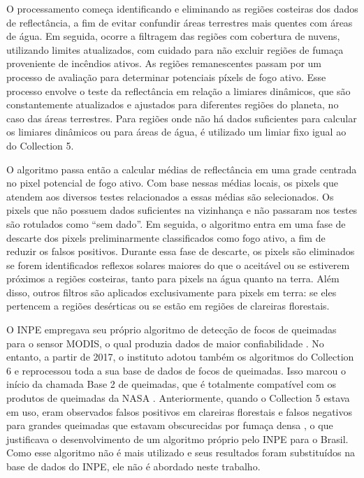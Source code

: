 \documentclass[cic,tc]{iiufrgs}
\begin{document}
O processamento começa identificando e eliminando as regiões costeiras dos dados de reflectância, a fim de evitar confundir áreas terrestres mais quentes com áreas de água. Em seguida, ocorre a filtragem das regiões com cobertura de nuvens, utilizando limites atualizados, com cuidado para não excluir regiões de fumaça proveniente de incêndios ativos. As regiões remanescentes passam por um processo de avaliação para determinar potenciais píxels de fogo ativo. Esse processo envolve o teste da reflectância em relação a limiares dinâmicos, que são constantemente atualizados e ajustados para diferentes regiões do planeta, no caso das áreas terrestres. Para regiões onde não há dados suficientes para calcular os limiares dinâmicos ou para áreas de água, é utilizado um limiar fixo igual ao do Collection 5.

O algoritmo passa então a calcular médias de reflectância em uma grade centrada no pixel potencial de fogo ativo. Com base nessas médias locais, os pixels que atendem aos diversos testes relacionados a essas médias são selecionados. Os pixels que não possuem dados suficientes na vizinhança e não passaram nos testes são rotulados como ``sem dado''. Em seguida, o algoritmo entra em uma fase de descarte dos pixels preliminarmente classificados como fogo ativo, a fim de reduzir os falsos positivos. Durante essa fase de descarte, os pixels são eliminados se forem identificados reflexos solares maiores do que o aceitável ou se estiverem próximos a regiões costeiras, tanto para pixels na água quanto na terra. Além disso, outros filtros são aplicados exclusivamente para pixels em terra: se eles pertencem a regiões desérticas ou se estão em regiões de clareiras florestais.

O INPE empregava seu próprio algoritmo de detecção de focos de queimadas para o sensor MODIS, o qual produzia dados de maior confiabilidade \citep{PerguntasFrequentesINPE}. No entanto, a partir de 2017, o instituto adotou também os algoritmos do Collection 6 e reprocessou toda a sua base de dados de focos de queimadas. Isso marcou o início da chamada Base 2 de queimadas, que é totalmente compatível com os produtos de queimadas da NASA \citep{PerguntasFrequentesINPE}. Anteriormente, quando o Collection 5 estava em uso, eram observados falsos positivos em clareiras florestais e falsos negativos para grandes queimadas que estavam obscurecidas por fumaça densa \citep{SCHROEDER2008}, o que justificava o desenvolvimento de um algoritmo próprio pelo INPE para o Brasil. Como esse algoritmo  não é mais utilizado e seus resultados foram substituídos na base de dados do INPE, ele não é abordado neste trabalho.
\end{document}

